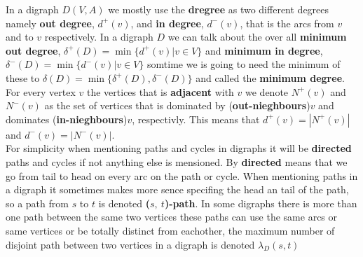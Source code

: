 In a digraph $D(V,A)$ we mostly use the \textbf{dregree} as two different degrees namely \textbf{out degree}, $d^+(v)$, and \textbf{in degree}, $d^-(v)$, that is the arcs from $v$ and to $v$ respectively. 
In a digraph $D$ we can talk about the over all \textbf{minimum out degree}, $\delta ^+(D)=\min\lbrace d^+(v)|v\in V\rbrace$ and \textbf{minimum in degree}, $\delta ^-(D)=\min\lbrace d^-(v)|v\in V\rbrace$
somtime we is going to need the minimum of these to $\delta(D)=\min \lbrace\delta ^+(D),\delta ^-(D) \rbrace$ and called the \textbf{minimum degree}.
For every vertex $v$ the vertices that is \textbf{adjacent} with $v$ we denote $N^+(v)$ and $N^-(v)$ as the set of vertices that is dominated by (\textbf{out-nieghbours})$v$ and dominates (\textbf{in-nieghbours})$v$, respectivly. 
This means that $d^+(v)=|N^+(v)|$ and $d^-(v)=|N^-(v)|$.\\
For simplicity when mentioning paths and cycles in digraphs it will be \textbf{directed} paths and cycles if not anything else is mensioned. 
By \textbf{directed} means that we go from tail to head on every arc on the path or cycle.
When mentioning paths in a digraph it sometimes makes more sence specifing the head an tail of the path, so a path from $s$ to $t$ is denoted \textbf{($s,\ t$)-path}.
In some digraphs there is more than one path between the same two vertices these paths can use the same arcs or same vertices or be totally distinct from eachother, the maximum number of disjoint path between two vertices in a digraph is denoted $\lambda_D(s,t)$
 



